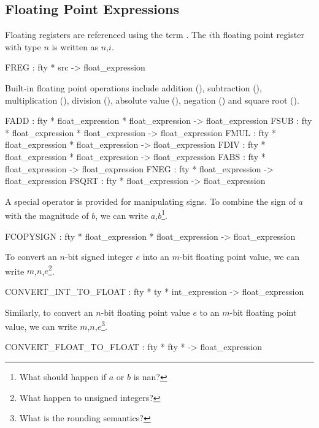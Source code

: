 \subsection{Floating Point Expressions}

 Floating registers are referenced using the term .  The
$i$th floating point register with type $n$ is written 
as $n$,$i$\sml{)}.
\begin{SML}
   FREG   : fty * src -> float_expression
\end{SML}

Built-in floating point operations include addition (), 
subtraction (), multiplication (), division 
(), absolute value (), negation ()
and square root ().
\begin{SML}
   FADD  : fty * float_expression * float_expression -> float_expression
   FSUB  : fty * float_expression * float_expression  -> float_expression
   FMUL  : fty * float_expression * float_expression -> float_expression
   FDIV  : fty * float_expression * float_expression -> float_expression
   FABS  : fty * float_expression -> float_expression
   FNEG  : fty * float_expression -> float_expression
   FSQRT : fty * float_expression -> float_expression
\end{SML}

A special operator is provided for manipulating signs.
To combine the sign of $a$ with the magnitude of $b$, we can
write $a$,$b$\sml{)}\footnote{What should 
happen if $a$ or $b$ is nan?}.
\begin{SML}
   FCOPYSIGN : fty * float_expression * float_expression -> float_expression
\end{SML}

To convert an $n$-bit signed integer $e$ into an $m$-bit floating point value,
we can write $m$,$n$,$e$\sml{)}\footnote{What happen to unsigned integers?}.
\begin{SML}
   CONVERT_INT_TO_FLOAT : fty * ty * int_expression -> float_expression
\end{SML}

Similarly, to convert an $n$-bit floating point value $e$ to an $m$-bit
floating point value, we can write $m$,$n$,$e$\sml{)}\footnote{
What is the rounding semantics?}.
\begin{SML}
   CONVERT_FLOAT_TO_FLOAT : fty * fty * -> float_expression
\end{SML}

